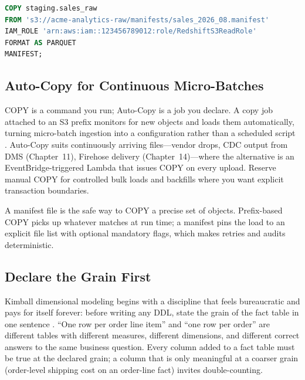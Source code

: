 \begin{lstlisting}[language=SQL,caption={COPY with an IAM role, a manifest, and Parquet input.},label={lst:ch5-copy}]
COPY staging.sales_raw
FROM 's3://acme-analytics-raw/manifests/sales_2026_08.manifest'
IAM_ROLE 'arn:aws:iam::123456789012:role/RedshiftS3ReadRole'
FORMAT AS PARQUET
MANIFEST;
\end{lstlisting}

\subsection{Auto-Copy for Continuous Micro-Batches}
COPY is a command you run; Auto-Copy is a job you declare. A copy job attached to an S3 prefix monitors for new objects and loads them automatically, turning micro-batch ingestion into a configuration rather than a scheduled script \cite{awsRedshiftCOPY}. Auto-Copy suits continuously arriving files---vendor drops, CDC output from DMS (Chapter~11), Firehose delivery (Chapter~14)---where the alternative is an EventBridge-triggered Lambda that issues COPY on every upload. Reserve manual COPY for controlled bulk loads and backfills where you want explicit transaction boundaries.

\begin{notebox}
A manifest file is the safe way to COPY a precise set of objects. Prefix-based COPY picks up whatever matches at run time; a manifest pins the load to an explicit file list with optional mandatory flags, which makes retries and audits deterministic.
\end{notebox}

\subsection{Declare the Grain First}
Kimball dimensional modeling begins with a discipline that feels bureaucratic and pays for itself forever: before writing any DDL, state the grain of the fact table in one sentence \cite{kimballDWToolkit}. ``One row per order line item'' and ``one row per order'' are different tables with different measures, different dimensions, and different correct answers to the same business question. Every column added to a fact table must be true at the declared grain; a column that is only meaningful at a coarser grain (order-level shipping cost on an order-line fact) invites double-counting.

